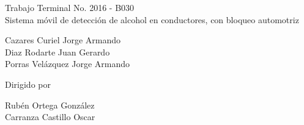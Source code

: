 \begin{titlepage}
\begin{minipage}{0.20\textwidth}
    \end{minipage}
    
    \vspace{1cm}
    
    \centering
    \Large{Trabajo Terminal No. 2016 - B030\\Sistema móvil de detección de alcohol en conductores, con bloqueo automotriz} \par
    
    \vspace{1cm}
    
    \large{Cazares Curiel Jorge Armando\\Diaz Rodarte Juan Gerardo\\Porras Velázquez Jorge Armando} \par
    
    \vspace{1cm}
    
	\small{Dirigido por}\par
	\normalsize{Rubén Ortega González\\Carranza Castillo Oscar}
    
\end{titlepage}